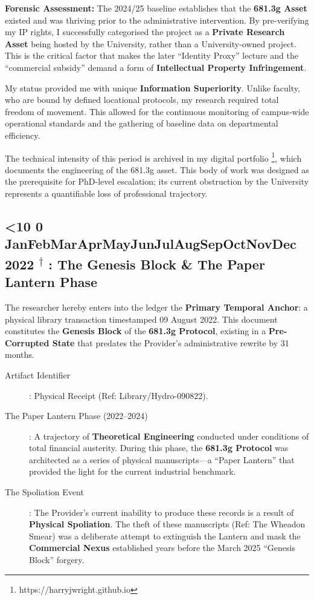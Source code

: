 \documentclass{EMBASSY}
\DeclareRobustCommand{\gmt}[3]{%
    \texorpdfstring{%
        {\color{DateGold}\textbf{%
            \ifnum#1<10 0\fi#1\,\textperiodcentered\,%
            \ifcase#2\or Jan\or Feb\or Mar\or Apr\or May\or Jun\or Jul\or Aug\or Sep\or Oct\or Nov\or Dec\fi
            \,\textperiodcentered\,20#3%
            \textsuperscript{$\dagger$}%
        }}%
    }{%
        (#1/#2/#3)%
    }%
}
\begin{document}
\noindent\textbf{Forensic Assessment:} The 2024/25 baseline establishes that the \textbf{681.3g Asset} existed and was thriving prior to the administrative intervention. By pre-verifying my IP rights, I successfully categorised the project as a \textbf{Private Research Asset} being hosted by the University, rather than a University-owned project. This is the critical factor that makes the later ``Identity Proxy'' lecture and the ``commercial subsidy'' demand a form of \textbf{Intellectual Property Infringement}.

My status provided me with unique \textbf{Information Superiority}. Unlike faculty, who are bound by defined locational protocols, my research required total freedom of movement. This allowed for the continuous monitoring of campus-wide operational standards and the gathering of baseline data on departmental efficiency.

The technical intensity of this period is archived in my digital portfolio \footnote{https://harryjwright.github.io}, which documents the engineering of the 681.3g asset. This body of work was designed as the prerequisite for PhD-level escalation; its current obstruction by the University represents a quantifiable loss of professional trajectory.

\subsection{\gmt{9}{8}{22}: The Genesis Block \& The Paper Lantern Phase}
The researcher hereby enters into the ledger the \textbf{Primary Temporal Anchor}: a physical library transaction timestamped 09 August 2022. This document constitutes the \textbf{Genesis Block} of the \textbf{681.3g Protocol}, existing in a \textbf{Pre-Corrupted State} that predates the Provider’s administrative rewrite by 31 months.

\begin{description}
	\item[Artifact Identifier]: Physical Receipt (Ref: Library/Hydro-090822).
	\item[The Paper Lantern Phase (2022--2024)]: A trajectory of \textbf{Theoretical Engineering} conducted under conditions of total financial austerity. During this phase, the \textbf{681.3g Protocol} was architected as a series of physical manuscripts---a ``Paper Lantern'' that provided the light for the current industrial benchmark.
	\item[The Spoliation Event]: The Provider’s current inability to produce these records is a result of \textbf{Physical Spoliation}. The theft of these manuscripts (Ref: The Wheadon Smear) was a deliberate attempt to extinguish the Lantern and mask the \textbf{Commercial Nexus} established years before the March 2025 ``Genesis Block'' forgery.
\end{description}
\end{document}
